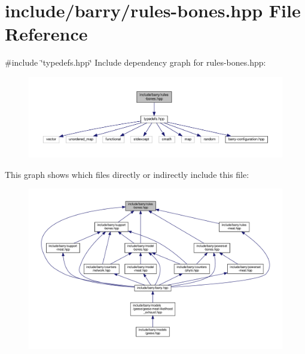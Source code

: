 \hypertarget{rules-bones_8hpp}{}\section{include/barry/rules-\/bones.hpp File Reference}
\label{rules-bones_8hpp}
{\ttfamily \#include \char`\"{}typedefs.\+hpp\char`\"{}}\newline
Include dependency graph for rules-\/bones.hpp\+:\nopagebreak
\begin{figure}[H]
\begin{center}
\leavevmode
\includegraphics[width=350pt]{rules-bones_8hpp__incl}
\end{center}
\end{figure}
This graph shows which files directly or indirectly include this file\+:\nopagebreak
\begin{figure}[H]
\begin{center}
\leavevmode
\includegraphics[width=350pt]{rules-bones_8hpp__dep__incl}
\end{center}
\end{figure}

